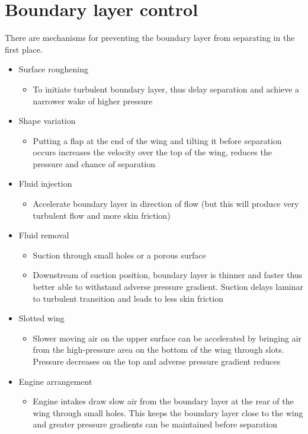 \documentclass[class=report, crop=false, 12pt,a4paper]{standalone}
\begin{document}
\section{Boundary layer control}
There are mechanisms for preventing the boundary layer from separating in the first place.
\begin{itemize}
  \item Surface roughening
  \begin{itemize}
    \item To initiate turbulent boundary layer, thus delay separation and achieve a narrower wake of higher pressure
  \end{itemize}
  \item Shape variation
  \begin{itemize}
    \item Putting a flap at the end of the wing and tilting it before separation occurs increases the velocity over the top of the wing, reduces the pressure and chance of separation 
  \end{itemize}
  \item Fluid injection
  \begin{itemize}
    \item Accelerate boundary layer in direction of flow (but this will produce very turbulent flow and more skin friction)
  \end{itemize}
  \item Fluid removal
  \begin{itemize}
    \item Suction through small holes or a porous surface
    \item Downstream of suction position, boundary layer is thinner and faster thus better able to withstand adverse pressure gradient. Suction delays laminar to turbulent transition and leads to less skin friction
  \end{itemize}
  \item Slotted wing
  \begin{itemize}
    \item Slower moving air on the upper surface can be accelerated by bringing air from the high-pressure area on the bottom of the wing through slots. Pressure decreases on the top and adverse pressure gradient reduces
  \end{itemize}
  \item Engine arrangement
  \begin{itemize}
    \item Engine intakes draw slow air from the boundary layer at the rear of the wing through small holes. This keeps the boundary layer close to the wing and greater pressure gradients can be maintained before separation
  \end{itemize}
\end{itemize}
\end{document}
